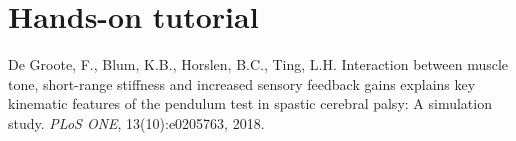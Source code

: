 \documentclass[
a4paper, %
11pt, %
onecolumn, %
openright, %
]{memoir}
\begin{document}
\chapter{Hands-on tutorial}





\begin{thebibliography}{9}
De Groote, F., Blum, K.B., Horslen, B.C., Ting, L.H. Interaction between muscle tone, short-range stiffness and increased sensory feedback gains explains key kinematic features of the pendulum test in spastic cerebral palsy: A simulation study. 
\textit{PLoS ONE}, 13(10):e0205763, 2018. 
\end{thebibliography}
\end{document}
